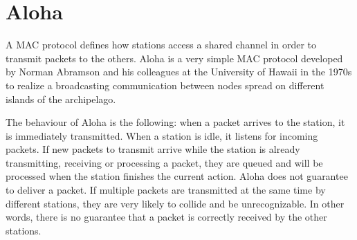 \section{Aloha}
\label{sec:aloha}

A \ac{MAC} protocol defines how stations access a shared channel in order to transmit packets to the others.
Aloha is a very simple \ac{MAC} protocol developed by Norman Abramson and his colleagues at the University of Hawaii in the 1970s to realize a broadcasting communication between nodes spread on different islands of the archipelago. 

The behaviour of Aloha is the following: when a packet arrives to the station, it is immediately transmitted.
When a station is idle, it listens for incoming packets.
If new packets to transmit arrive while the station is already transmitting, receiving or processing a packet, they are queued and will be processed when the station finishes the current action.
Aloha does not guarantee to deliver a packet.
If multiple packets are transmitted at the same time by different stations, they are very likely to collide and be unrecognizable.
In other words, there is no guarantee that a packet is correctly received by the other stations.
